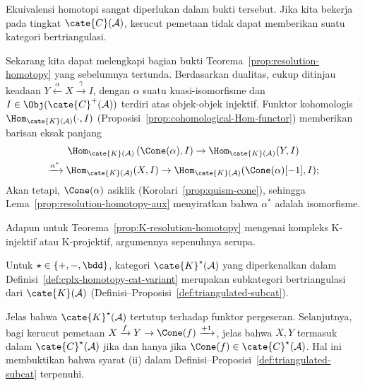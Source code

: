 Ekuivalensi homotopi sangat diperlukan dalam bukti tersebut. Jika kita bekerja
pada tingkat $\cate{C}(\mathcal{A})$, kerucut pemetaan tidak dapat memberikan
suatu kategori bertriangulasi.

\begin{bukti}
	Sekarang kita dapat melengkapi bagian bukti
	Teorema~\ref{prop:resolution-homotopy} yang sebelumnya tertunda. Berdasarkan
	dualitas, cukup ditinjau keadaan $Y \xleftarrow{\alpha} X \xrightarrow{\gamma} I$,
	dengan $\alpha$ suatu kuasi-isomorfisme dan
	$I \in \Obj(\cate{C}^+(\mathcal{A}))$ terdiri atas objek-objek injektif.
	Funktor kohomologis $\Hom_{\cate{K}(\mathcal{A})}(\cdot, I)$
	(Proposisi~\ref{prop:cohomological-Hom-functor}) memberikan barisan eksak
	panjang
	\begin{multline*}
		\Hom_{\cate{K}(\mathcal{A})}\left( \Cone(\alpha), I \right)  \to \Hom_{\cate{K}(\mathcal{A})}(Y, I) \\
		\xrightarrow{\alpha^*} \Hom_{\cate{K}(\mathcal{A})}(X, I) \to \Hom_{\cate{K}(\mathcal{A})}(\Cone(\alpha)[-1], I);
	\end{multline*}
	Akan tetapi, $\Cone(\alpha)$ asiklik
	(Korolari~\ref{prop:quism-cone}), sehingga
	Lema~\ref{prop:resolution-homotopy-aux} menyiratkan bahwa $\alpha^*$ adalah
	isomorfisme.

	Adapun untuk Teorema~\ref{prop:K-resolution-homotopy} mengenai kompleks
	K-injektif atau K-projektif, argumennya sepenuhnya serupa.
\end{bukti}

\begin{korolari}
	Untuk $\star \in \{+, -, \bdd\}$, kategori
	$\cate{K}^\star(\mathcal{A})$ yang diperkenalkan dalam
	Definisi~\ref{def:cplx-homotopy-cat-variant} merupakan subkategori
	bertriangulasi dari $\cate{K}(\mathcal{A})$
	(Definisi--Proposisi~\ref{def:triangulated-subcat}).
\end{korolari}

\begin{bukti}
	Jelas bahwa $\cate{K}^\star(\mathcal{A})$ tertutup terhadap funktor
	pergeseran. Selanjutnya, bagi kerucut pemetaan
	$X \xrightarrow{f} Y \to \Cone(f) \xrightarrow{+1}$, jelas bahwa $X,Y$
	termasuk dalam $\cate{C}^\star(\mathcal{A})$ jika dan hanya jika
	$\Cone(f) \in \cate{C}^\star(\mathcal{A})$. Hal ini membuktikan bahwa syarat
	(ii) dalam Definisi--Proposisi~\ref{def:triangulated-subcat} terpenuhi.
\end{bukti}

